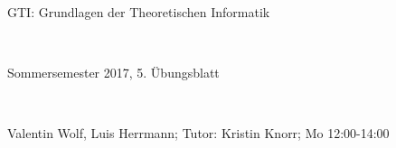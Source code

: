 \documentclass{article}
\begin{document}
	
	\hrulefill
	\begin{center}
		\bfseries %
		\sffamily %
		\begin{huge}
			GTI: Grundlagen der Theoretischen Informatik
		\end{huge}\\
		\begin{Large}
			Sommersemester 2017, 5. Übungsblatt
		\end{Large}\\
		\begin{small}
			Valentin Wolf, Luis Herrmann; Tutor: Kristin Knorr; Mo 12:00-14:00
		\end{small}
		
		\vspace{-10pt}
	\end{center}
	\hrulefill
	
\end{document}
